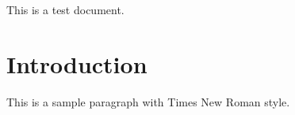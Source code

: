 \documentclass{article}
\begin{document}
	This is a test document.
	
	\section{Introduction}
	This is a sample paragraph with Times New Roman style.
\end{document}
